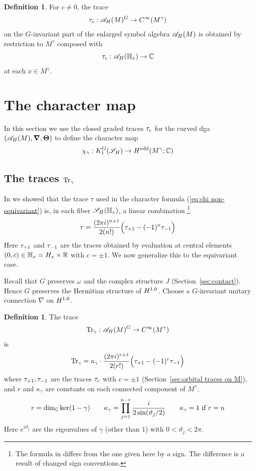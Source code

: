 \documentclass[11pt]{amsart}
\theoremstyle{plain}
\theoremstyle{definition}
\newtheorem{definition}[theorem]{Definition}
\theoremstyle{remark}
\begin{document}
\begin{definition}
For $c\ne 0$, the trace
\[ \tau_{c}:{\mathscr{A}}_H(M)^G\to C^\infty(M^\gamma) \]
on the $G$-invariant part of the enlarged symbol algebra ${\mathscr{A}}_H(M)$ is
obtained by restriction to $M^\gamma$ composed with
\[\tau_{c}:{\mathscr{A}}_H(\mathbb{H}_x)\to {\mathbb{C}}\]
at each $x\in M^\gamma$.
\end{definition}





\section{The character map}\label{sec:character map}

In this section  we use the closed graded traces $\tau_{c}$ for the curved dga $({\mathscr{A}}_H(M), \boldsymbol{\nabla},\boldsymbol{\Theta})$ to define the character map
\[ \chi_\gamma:K_1^G({\mathscr{S}_H})\to H^{\mathrm{odd}}(M^\gamma;{\mathbb{C}})\]




\subsection{The traces $\operatorname{Tr}_\gamma$}\label{sec:Tr_gamma}

In \cite{GvE25} we showed that the trace $\tau$ used in the character formula (\ref{eq:chi non-equivariant}) is, in each fiber ${\mathscr{S}_H}(\mathbb{H}_x)$, a linear combination
\footnote{The formula in \cite{GvE25} differs from the one given here by a sign. The difference is a result of changed sign conventions.}
\[ \tau = \frac{(2\pi i)^{n+1}}{2(n!)}\Bigl(\tau_{+1}-(-1)^n\tau_{-1}\Bigr)\]
Here $\tau_{+1}$ and $\tau_{-1}$ are the traces obtained by evaluation at central elements $(0,c)\in \mathbb{H}_x = H_x\times{\mathbb{R}}$ with $c=\pm 1$.
We now generalize this to the equivariant case.

Recall that $G$ preserves $\omega$ and the complex structure $J$ (Section~\ref{sec:contact}).
Hence $G$ preserves the Hermitian structure of $H^{1,0}$.
Choose a $G$-invariant unitary connection $\nabla$ on $H^{1,0}$.



\begin{definition}\label{def:Tr_gamma}
The trace
\[ \operatorname{Tr}_\gamma:{\mathscr{A}}_H(M)^G\to C^\infty(M^\gamma)\]
is
\[ \operatorname{Tr}_\gamma = \kappa_\gamma \cdot \frac{(2\pi i)^{r+1}}{2(r!)}\Bigl(\tau_{+1}-(-1)^r\tau_{-1}\Bigr)\]
where $\tau_{+1}, \tau_{-1}$ are the traces $\tau_{c}$ with $c=\pm 1$ (Section~\ref{sec:orbital traces on M}),
and $r$ and $\kappa_\gamma$ are constants on each connected component of $M^\gamma$,
\[ r=\dim_{\mathbb{C}} \ker (1-\gamma)\qquad \kappa_\gamma=\prod_{j=1}^{n-r} \frac{i}{2 \sin (\vartheta_j/2)}\qquad \kappa_\gamma=1\text{ if } r=n\]
Here $e^{i\vartheta_j}$ are the eigenvalues of $\gamma$ (other than $1$)
with $0<\vartheta_j<2\pi$.
\end{definition}
\end{document}

